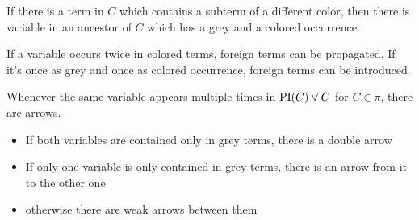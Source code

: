 \documentclass[,%
	paper=a4,%
	DIV12, %
	twoside=false,%
	liststotoc,
	bibtotoc,
	draft=false,%
	numbers=noendperiod
]{scrartcl}
\begin{document}
\begin{conj}
	If there is a term in $C$ which contains a subterm of a different color, then there is variable in an ancestor of $C$ which has a grey and a colored occurrence.
\end{conj}

If a variable occurs twice in colored terms, foreign terms can be propagated.
If it's once as grey and once as colored occurrence, foreign terms can be introduced.




\begin{lemma}
	\label{lemma:arrow_for_same_variables}
	Whenever the same variable appears multiple times in $\operatorname{PI}(C)\lor C$ for $C \in \pi$, there are arrows.

	\begin{itemize}
		\item If both variables are contained only in grey terms, there is a double arrow 
		\item If only one variable is only contained in grey terms, there is an arrow from it to the other one 
		\item otherwise there are weak arrows between them 
	\end{itemize}
\end{lemma}
\end{document}
